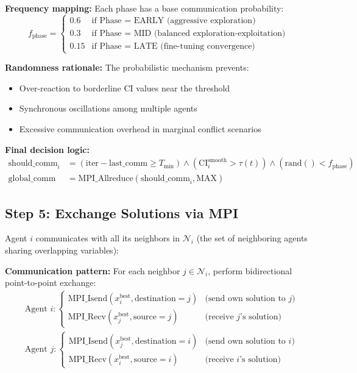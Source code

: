 \documentclass[11pt,a4paper]{article}
\begin{document}
\textbf{Frequency mapping:} Each phase has a base communication probability:
\begin{equation}
f_{\text{phase}} = \begin{cases}
0.6 & \text{if Phase = EARLY (aggressive exploration)} \\
0.3 & \text{if Phase = MID (balanced exploration-exploitation)} \\
0.15 & \text{if Phase = LATE (fine-tuning convergence)}
\end{cases}
\end{equation}

\textbf{Randomness rationale:} The probabilistic mechanism prevents:
\begin{itemize}
    \item Over-reaction to borderline CI values near the threshold
    \item Synchronous oscillations among multiple agents
    \item Excessive communication overhead in marginal conflict scenarios
\end{itemize}

\textbf{Final decision logic:}
\begin{align}
\text{should\_comm}_i &= (\text{iter} - \text{last\_comm} \geq T_{\min}) \land (\text{CI}_i^{\text{smooth}} > \tau(t)) \land (\text{rand}() < f_{\text{phase}}) \\
\text{global\_comm} &= \text{MPI\_Allreduce}(\text{should\_comm}_i, \text{MAX})
\end{align}

\subsection{Step 5: Exchange Solutions via MPI}

Agent $i$ communicates with all its neighbors in $\mathcal{N}_i$ (the set of neighboring agents sharing overlapping variables):

\textbf{Communication pattern:} For each neighbor $j \in \mathcal{N}_i$, perform bidirectional point-to-point exchange:
\begin{equation}
\begin{aligned}
&\text{Agent } i: \begin{cases}
\text{MPI\_Isend}(x_i^{\text{best}}, \text{destination}=j) & \text{(send own solution to } j\text{)} \\
\text{MPI\_Recv}(x_j^{\text{best}}, \text{source}=j) & \text{(receive } j\text{'s solution)}
\end{cases} \\
&\text{Agent } j: \begin{cases}
\text{MPI\_Isend}(x_j^{\text{best}}, \text{destination}=i) & \text{(send own solution to } i\text{)} \\
\text{MPI\_Recv}(x_i^{\text{best}}, \text{source}=i) & \text{(receive } i\text{'s solution)}
\end{cases}
\end{aligned}
\end{equation}
\end{document}
